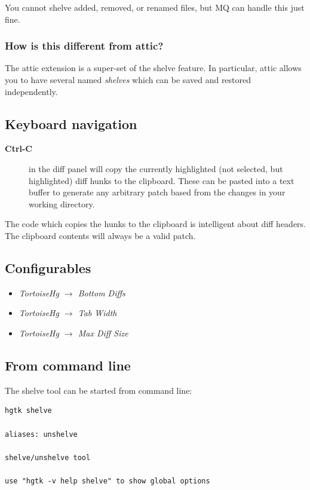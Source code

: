 \documentclass[letterpaper,10pt,english]{manual}
\begin{document}
You cannot shelve added, removed, or renamed files, but MQ can handle
this just fine.


\subsubsection{How is this different from attic?}

The attic extension is a super-set of the shelve feature. In particular,
attic allows you to have several named \emph{shelves} which can be saved and
restored independently.


\subsection{Keyboard navigation}
\begin{description}
\item[\textbf{Ctrl-C}]
in the diff panel will copy the currently highlighted (not selected,
but highlighted) diff hunks to the clipboard. These can be pasted
into a text buffer to generate any arbitrary patch based from the
changes in your working directory.

\end{description}

The code which copies the hunks to the clipboard is intelligent about
diff headers.  The clipboard contents will always be a valid patch.


\subsection{Configurables}
\begin{itemize}
\item {} 
\emph{TortoiseHg \(\rightarrow\) Bottom Diffs}

\item {} 
\emph{TortoiseHg \(\rightarrow\) Tab Width}

\item {} 
\emph{TortoiseHg \(\rightarrow\) Max Diff Size}

\end{itemize}


\subsection{From command line}

The shelve tool can be started from command line:

\begin{Verbatim}[commandchars=@\[\]]
hgtk shelve

aliases: unshelve

shelve/unshelve tool

use "hgtk -v help shelve" to show global options
\end{Verbatim}
\end{document}
